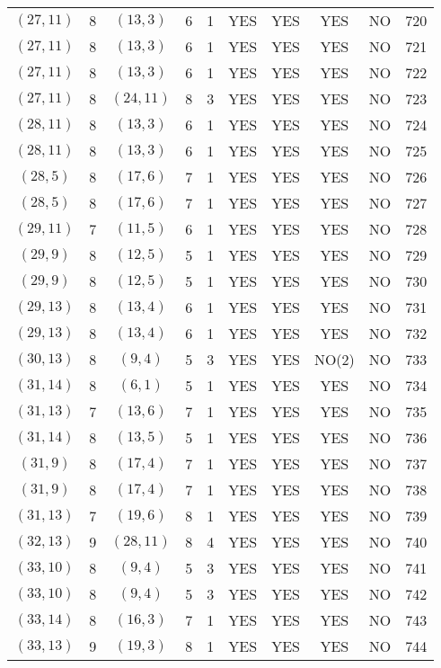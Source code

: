 \begin{longtable}{|c|c|c|c|c|c|c|c|c|c|}
$(27, 11)$ & 8 & $(13, 3)$ & 6 & 1 & YES & YES & YES & NO & 720\\
$(27, 11)$ & 8 & $(13, 3)$ & 6 & 1 & YES & YES & YES & NO & 721\\
$(27, 11)$ & 8 & $(13, 3)$ & 6 & 1 & YES & YES & YES & NO & 722\\
$(27, 11)$ & 8 & $(24, 11)$ & 8 & 3 & YES & YES & YES & NO & 723\\
$(28, 11)$ & 8 & $(13, 3)$ & 6 & 1 & YES & YES & YES & NO & 724\\
$(28, 11)$ & 8 & $(13, 3)$ & 6 & 1 & YES & YES & YES & NO & 725\\
$(28, 5)$ & 8 & $(17, 6)$ & 7 & 1 & YES & YES & YES & NO & 726\\
$(28, 5)$ & 8 & $(17, 6)$ & 7 & 1 & YES & YES & YES & NO & 727\\
$(29, 11)$ & 7 & $(11, 5)$ & 6 & 1 & YES & YES & YES & NO & 728\\
$(29, 9)$ & 8 & $(12, 5)$ & 5 & 1 & YES & YES & YES & NO & 729\\
$(29, 9)$ & 8 & $(12, 5)$ & 5 & 1 & YES & YES & YES & NO & 730\\
$(29, 13)$ & 8 & $(13, 4)$ & 6 & 1 & YES & YES & YES & NO & 731\\
$(29, 13)$ & 8 & $(13, 4)$ & 6 & 1 & YES & YES & YES & NO & 732\\
$(30, 13)$ & 8 & $(9, 4)$ & 5 & 3 & YES & YES & NO(2) & NO & 733\\
$(31, 14)$ & 8 & $(6, 1)$ & 5 & 1 & YES & YES & YES & NO & 734\\
$(31, 13)$ & 7 & $(13, 6)$ & 7 & 1 & YES & YES & YES & NO & 735\\
$(31, 14)$ & 8 & $(13, 5)$ & 5 & 1 & YES & YES & YES & NO & 736\\
$(31, 9)$ & 8 & $(17, 4)$ & 7 & 1 & YES & YES & YES & NO & 737\\
$(31, 9)$ & 8 & $(17, 4)$ & 7 & 1 & YES & YES & YES & NO & 738\\
$(31, 13)$ & 7 & $(19, 6)$ & 8 & 1 & YES & YES & YES & NO & 739\\
$(32, 13)$ & 9 & $(28, 11)$ & 8 & 4 & YES & YES & YES & NO & 740\\
$(33, 10)$ & 8 & $(9, 4)$ & 5 & 3 & YES & YES & YES & NO & 741\\
$(33, 10)$ & 8 & $(9, 4)$ & 5 & 3 & YES & YES & YES & NO & 742\\
$(33, 14)$ & 8 & $(16, 3)$ & 7 & 1 & YES & YES & YES & NO & 743\\
$(33, 13)$ & 9 & $(19, 3)$ & 8 & 1 & YES & YES & YES & NO & 744\\

\end{longtable}
